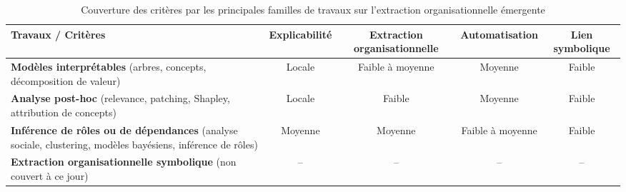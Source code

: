 \begin{table}[h!]
  \centering
  \caption{Couverture des critères par les principales familles de travaux sur l’extraction organisationnelle émergente}
  \label{tab:couverture_criteres_travaux_anl}
  \begin{tabular}{|p{6.5cm}|c|c|c|c|}
    \hline
    \textbf{Travaux / Critères} & \textbf{Explicabilité} & \textbf{Extraction organisationnelle} & \textbf{Automatisation} & \textbf{Lien symbolique} \\
    \hline
    \textbf{Modèles interprétables} \newline
    (arbres, concepts, décomposition de valeur) \newline
    \cite{zhang2024advancing, milani2022maviper, milani2024interpretable, zabounidis2023concept, liu2025, iturria2024explainable, li2025from}
                                & Locale
                                & Faible à moyenne
                                & Moyenne
                                & Faible                                                                                                              \\
    \hline
    \textbf{Analyse post-hoc} \newline
    (relevance, patching, Shapley, attribution de concepts) \newline
    \cite{grupen2022concept, poupart2025perspectives, li2025from}
                                & Locale
                                & Faible
                                & Moyenne
                                & Faible                                                                                                              \\
    \hline
    \textbf{Inférence de rôles ou de dépendances} \newline
    (analyse sociale, clustering, modèles bayésiens, inférence de rôles) \newline
    \cite{berenji2000learning, yusuf2020inferential, serrino2019finding, Wang2020, subramanian2024neurosymbolic}
                                & Moyenne
                                & Moyenne
                                & Faible à moyenne
                                & Faible                                                                                                              \\
    \hline
    \textbf{Extraction organisationnelle symbolique} \newline
    (non couvert à ce jour)
                                & --
                                & --
                                & --
                                & --                                                                                                                  \\
    \hline
  \end{tabular}
\end{table}

